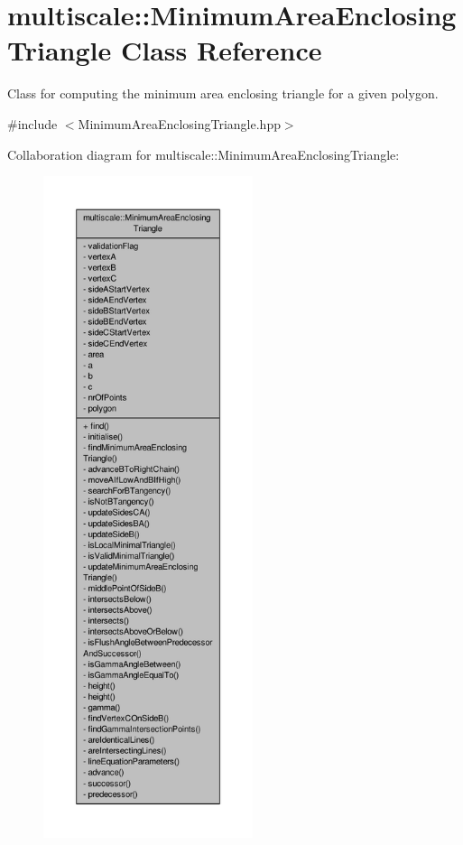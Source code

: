 \hypertarget{classmultiscale_1_1MinimumAreaEnclosingTriangle}{\section{multiscale\-:\-:Minimum\-Area\-Enclosing\-Triangle Class Reference}
\label{classmultiscale_1_1MinimumAreaEnclosingTriangle}
}


Class for computing the minimum area enclosing triangle for a given polygon.  




{\ttfamily \#include $<$Minimum\-Area\-Enclosing\-Triangle.\-hpp$>$}



Collaboration diagram for multiscale\-:\-:Minimum\-Area\-Enclosing\-Triangle\-:\nopagebreak
\begin{figure}[H]
\begin{center}
\leavevmode
\includegraphics[height=550pt]{classmultiscale_1_1MinimumAreaEnclosingTriangle__coll__graph}
\end{center}
\end{figure}
